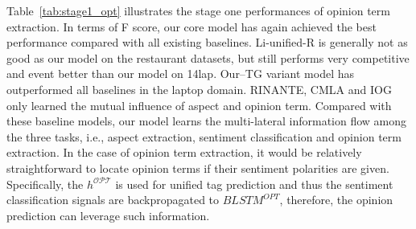 \documentclass[letterpaper]{article} \usepackage{aaai20}  \usepackage{times}  \usepackage{helvet} \usepackage{courier}  \usepackage[hyphens]{url}  \usepackage{graphicx} \urlstyle{rm} \def\UrlFont{\rm}  \usepackage{graphicx}  \frenchspacing  \setlength{\pdfpagewidth}{8.5in}  \setlength{\pdfpageheight}{11in}
\begin{document}
Table~\ref{tab:stage1_opt} illustrates the stage one performances of opinion term extraction. In terms of F score, our core model has again achieved the best performance compared with all existing baselines. Li-unified-R is generally not as good as our model on the restaurant datasets, but still performs very competitive and event better than our model on 14lap.
Our--TG variant model has outperformed all baselines in the laptop domain. RINANTE, CMLA and IOG only learned the mutual influence of aspect and opinion term. Compared with these baseline models, our model learns the multi-lateral information flow among the three tasks, i.e., aspect extraction, sentiment classification and opinion term extraction. In the case of opinion term extraction, it would be relatively straightforward to locate opinion terms if their sentiment polarities are given. Specifically, the $h^{\mathcal{OPT}}$ is used for unified tag prediction and thus the sentiment classification signals are backpropagated to $BLSTM^{OPT}$, therefore, the opinion prediction can leverage such information.
\end{document}
